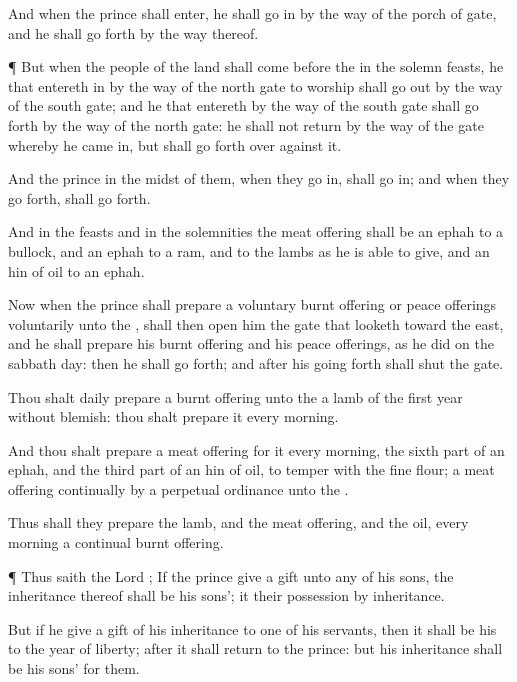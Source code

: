 {And when the
prince shall
enter, he shall
go in by the
way of the
porch of
{}
gate, and he shall go
forth by the
way thereof.


\par }{\PP {}¶ But when the
people of the
land shall
come
before the
{} in the solemn
feasts, he that
entereth in by the
way of the
north
gate to
worship shall go
out by the
way of the
south
gate; and he that
entereth by the
way of the
south
gate shall go
forth by the
way of the
north
gate: he shall not
return by the
way of the
gate whereby he came
in, but shall go
forth over
against it.

And the
prince in the
midst of them, when they go
in, shall go
in; and when they go
forth, shall go
forth.

And in the
feasts and in the
solemnities the meat
offering shall be an
ephah to a
bullock, and an
ephah to a
ram, and to the
lambs as he is
able to
give, and an
hin of
oil to an
ephah.

Now when the
prince shall
prepare a
voluntary burnt
offering or peace
offerings
voluntarily unto the
{},
{} shall then
open him the
gate that
looketh toward the
east, and he shall
prepare his burnt
offering and his peace
offerings, as he
did on the
sabbath
day: then he shall go
forth; and
after his going
forth
{} shall
shut the
gate.

Thou shalt
daily
prepare a burnt
offering unto the
{}
{} a
lamb of the
first
year without
blemish: thou shalt
prepare it
every
morning.

And thou shalt
prepare a meat
offering for it every
morning, the sixth
part of an
ephah, and the third
part of an
hin of
oil, to temper
with the fine
flour; a meat
offering
continually by a
perpetual
ordinance unto the
{}.

Thus shall they
prepare the
lamb, and the meat
offering, and the
oil, every
morning
{} a
continual burnt
offering.


\par }{\PP {}¶ Thus
saith the
Lord
{}; If the
prince
give a
gift unto
any of his
sons, the
inheritance thereof shall be his
sons’; it
{} their
possession by
inheritance.

But if he
give a
gift of his
inheritance to
one of his
servants, then it shall be his to the
year of
liberty; after it shall
return to the
prince: but his
inheritance shall be his
sons’ for them.

}
